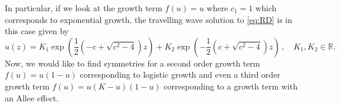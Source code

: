   In particular, if we look at the growth term $f(u)=u$ where $c_1=1$ which corresponds to exponential growth, the travelling wave solution to \eqref{eq:RD} is in this case given by
  \begin{equation}
    u(z)=K_1\exp{\left(\frac{1}{2}\left(-c+\sqrt{c^2-4}\right)z\right)}+K_2\exp{\left(-\frac{1}{2}\left(c+\sqrt{c^2-4}\right)z\right)}\,,\quad K_1,K_2\in\mathbb{R}.
    \label{eq:tv_RD}
  \end{equation}
  Now, we would like to find symmetries for a second order growth term $f(u)=u(1-u)$ corresponding to logistic growth and even a third order growth term $f(u)=u(K-u)(1-u)$ corresponding to a growth term with an Allee effect. 
  
